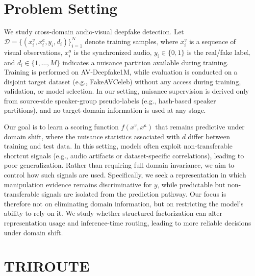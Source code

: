 \documentclass{article}
\begin{document}

\section{Problem Setting}
\vspace{-1em}
We study cross-domain audio-visual deepfake detection. Let $\mathcal{D} = \{(x_i^v, x_i^a, y_i, d_i)\}_{i=1}^N$ denote training samples, where $x_i^v$ is a sequence of visual observations, $x_i^a$ is the synchronized audio, $y_i \in \{0,1\}$ is the real/fake label, and $d_i \in \{1,\dots,M\}$ indicates a nuisance partition available during training.
Training is performed on AV-Deepfake1M, while evaluation is conducted on a disjoint target dataset (e.g., FakeAVCeleb) without any access during training, validation, or model selection. In our setting, nuisance supervision is derived only from source-side speaker-group pseudo-labels (e.g., hash-based speaker partitions), and no target-domain information is used at any stage.

Our goal is to learn a scoring function $f(x^v, x^a)$ that remains predictive under domain shift, where the nuisance statistics associated with $d$ differ between training and test data. In this setting, models often exploit non-transferable shortcut signals (e.g., audio artifacts or dataset-specific correlations), leading to poor generalization.
Rather than requiring full domain invariance, we aim to control how such signals are used. Specifically, we seek a representation in which manipulation evidence remains discriminative for $y$, while predictable but non-transferable signals are isolated from the prediction pathway. 
Our focus is therefore not on eliminating domain information, but on restricting the model's ability to rely on it. We study whether structured factorization can alter representation usage and inference-time routing, leading to more reliable decisions under domain shift.

\section{TRIROUTE}
\vspace{-0.7em}
\end{document}
